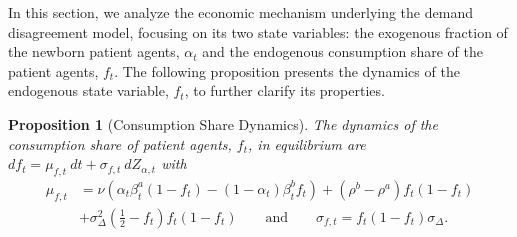 \documentclass[preprint,11pt,authoryear]{elsarticle}
\theoremstyle{plain}
\newtheorem{prop}{Proposition}
\begin{document}
In this section, we analyze the economic mechanism underlying the demand disagreement model, focusing on its two state variables: the exogenous fraction of the newborn patient agents, $\alpha_t$ and the endogenous consumption share of the patient agents, $f_t$. The following proposition presents the dynamics of the endogenous state variable, $f_t$, to further clarify its properties. 
\begin{prop}[Consumption Share Dynamics]\label{prop:df}
The dynamics of the consumption share of patient agents, $f_t$, in equilibrium are $df_t = \mu_{f,t} \: dt + \sigma_{f,t} \: dZ_{\alpha,t}$ with
\begin{equation}
  \begin{split}
	\label{eq:muf}
	\mu_{f,t} &= \nu\left(\alpha_t \beta^a_t \left(1-f_t\right) - \left(1-\alpha_t\right)\beta^b_t f_t\right) + \left(\rho^b-\rho^a\right)f_t\left(1-f_t\right) \\ 
	&+ \sigma_{\Delta}^2 \left( \frac{1}{2} - f_t \right) f_t\left(1-f_t\right) 
	\qquad \text{and} \qquad \sigma_{f,t} = f_t (1-f_t) \sigma_{\Delta}. 
  \end{split}
\end{equation}
\end{prop}
\end{document}
